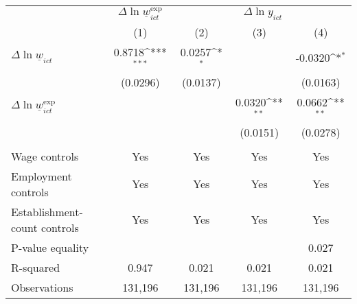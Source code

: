 {
\def\sym#1{\ifmmode^{#1}\else\(^{#1}\)\fi}
\begin{tabular}{l*{4}{c}}
\hline\hline
          &\multicolumn{1}{c}{$\Delta \ln \underline{w}_{ict}^{\text{exp}}$}&\multicolumn{3}{c}{$\Delta \ln y_{ict}$}                \\\cmidrule(lr){2-2}\cmidrule(lr){3-5}
          &\multicolumn{1}{c}{(1)}         &\multicolumn{1}{c}{(2)}         &\multicolumn{1}{c}{(3)}         &\multicolumn{1}{c}{(4)}         \\
\hline
$\Delta \ln \underline{w}_{ict}$&   0.8718\sym{***}&   0.0257\sym{*}  &                  &  -0.0320\sym{*}  \\
          & (0.0296)         & (0.0137)         &                  & (0.0163)         \\
[1em]
$\Delta \ln \underline{w}_{ict}^{\text{exp}}$&                  &                  &   0.0320\sym{**} &   0.0662\sym{**} \\
          &                  &                  & (0.0151)         & (0.0278)         \\
\hline
\vspace{-2mm}&                  &                  &                  &                  \\
Wage controls&      Yes         &      Yes         &      Yes         &      Yes         \\
Employment controls&      Yes         &      Yes         &      Yes         &      Yes         \\
Establishment-count controls&      Yes         &      Yes         &      Yes         &      Yes         \\
P-value equality&                  &                  &                  &    0.027         \\
R-squared &    0.947         &    0.021         &    0.021         &    0.021         \\
Observations&  131,196         &  131,196         &  131,196         &  131,196         \\
\hline\hline
\end{tabular}
}
